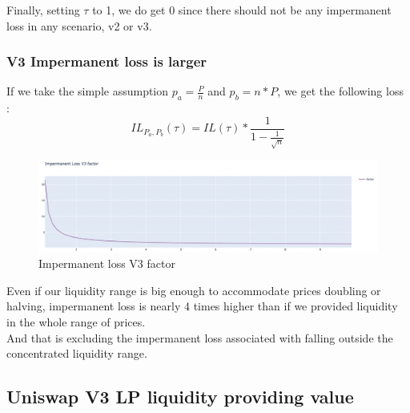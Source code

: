 \documentclass[conference]{IEEEtran}
\begin{document}
Finally, setting $\tau$ to 1, we do get 0 since there should not be any impermanent loss in any scenario, v2 or v3.\\
\subsubsection{V3 Impermanent loss is larger}

If we take the simple assumption $p_a = \frac{P}{n}$ and $p_b = n*P$, we get the following loss :
\begin{equation}\label{nasty_il}
IL_{P_a,P_b}(\tau) = IL(\tau) * \frac{1}{1-\frac{1}{\sqrt{n}}}
\end{equation}
\begin{figure}[h!]
    \centering
    \includegraphics[scale=0.15]{Plots/factor.png}
    \caption{Impermanent loss V3 factor}
    \label{fig:rangy_market}
\end{figure}

Even if our liquidity range is big enough to accommodate prices doubling or halving, impermanent loss is nearly 4 times higher than if we provided liquidity in the whole range of prices.\\
And that is excluding the impermanent loss associated with falling outside the concentrated liquidity range.\\
\subsection{Uniswap V3 LP liquidity providing value}
\end{document}
